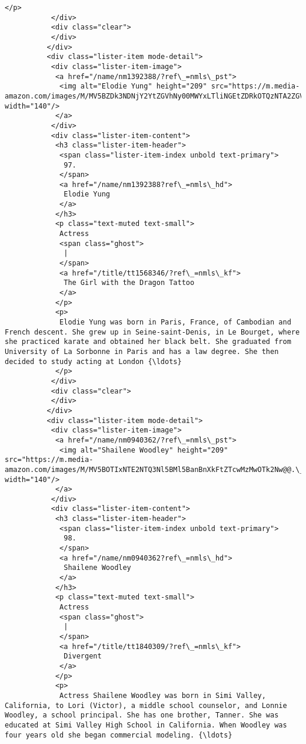 \documentclass[11pt]{article}
\begin{document}
\begin{Verbatim}[commandchars=\\\{\}]
            </p>
           </div>
           <div class="clear">
           </div>
          </div>
          <div class="lister-item mode-detail">
           <div class="lister-item-image">
            <a href="/name/nm1392388/?ref\_=nmls\_pst">
             <img alt="Elodie Yung" height="209" src="https://m.media-amazon.com/images/M/MV5BZDk3NDNjY2YtZGVhNy00MWYxLTliNGEtZDRkOTQzNTA2ZGVkXkEyXkFqcGdeQXVyNzA4NjYzMDk@.\_V1\_UY209\_CR86,0,140,209\_AL\_.jpg" width="140"/>
            </a>
           </div>
           <div class="lister-item-content">
            <h3 class="lister-item-header">
             <span class="lister-item-index unbold text-primary">
              97.
             </span>
             <a href="/name/nm1392388?ref\_=nmls\_hd">
              Elodie Yung
             </a>
            </h3>
            <p class="text-muted text-small">
             Actress
             <span class="ghost">
              |
             </span>
             <a href="/title/tt1568346/?ref\_=nmls\_kf">
              The Girl with the Dragon Tattoo
             </a>
            </p>
            <p>
             Elodie Yung was born in Paris, France, of Cambodian and French descent. She grew up in Seine-saint-Denis, in Le Bourget, where she practiced karate and obtained her black belt. She graduated from University of La Sorbonne in Paris and has a law degree. She then decided to study acting at London {\ldots}
            </p>
           </div>
           <div class="clear">
           </div>
          </div>
          <div class="lister-item mode-detail">
           <div class="lister-item-image">
            <a href="/name/nm0940362/?ref\_=nmls\_pst">
             <img alt="Shailene Woodley" height="209" src="https://m.media-amazon.com/images/M/MV5BOTIxNTE2NTQ3Nl5BMl5BanBnXkFtZTcwMzMwOTk2Nw@@.\_V1\_UX140\_CR0,0,140,209\_AL\_.jpg" width="140"/>
            </a>
           </div>
           <div class="lister-item-content">
            <h3 class="lister-item-header">
             <span class="lister-item-index unbold text-primary">
              98.
             </span>
             <a href="/name/nm0940362?ref\_=nmls\_hd">
              Shailene Woodley
             </a>
            </h3>
            <p class="text-muted text-small">
             Actress
             <span class="ghost">
              |
             </span>
             <a href="/title/tt1840309/?ref\_=nmls\_kf">
              Divergent
             </a>
            </p>
            <p>
             Actress Shailene Woodley was born in Simi Valley, California, to Lori (Victor), a middle school counselor, and Lonnie Woodley, a school principal. She has one brother, Tanner. She was educated at Simi Valley High School in California. When Woodley was four years old she began commercial modeling. {\ldots}

\end{Verbatim}
\end{document}
